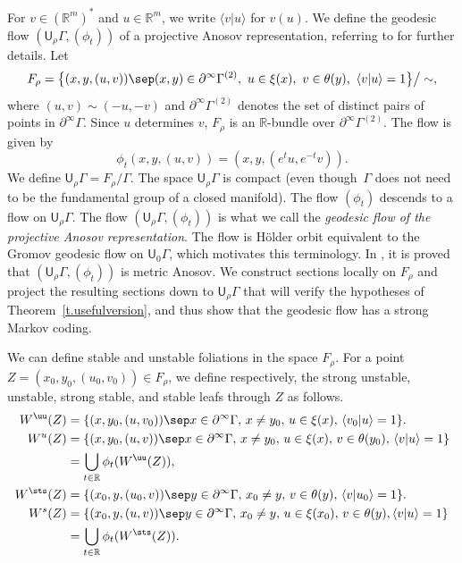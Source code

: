 For $v\in (\mathbb{R}^m)^*$ and $u\in\mathbb{R}^m$, we write $\langle v | u \rangle$ for $v(u)$. We define the geodesic flow $(\mathsf{U}_\rho\Gamma,(\phi_t))$ of a projective Anosov representation, referring to \cite[\S4]{bcls} for further details. Let\vspace*{-3pt}
\[ F_\rho = \bigl\{ (x,y,(u,v)) \sep (x,y)\in\partial^\infty\Gamma^{(2)}, \ u\in \xi(x), \ v\in \theta(y), \ \langle v|u\rangle =1\bigr\}\big/\sim,\]
where $(u,v)\sim(-u,-v)$ and $\partial^\infty\Gamma^{(2)}$ denotes the set of distinct pairs of points in $\partial^\infty\Gamma$. Since $u$ determines $v$, $F_\rho$ is an $\mathbb{R}$-bundle over $\partial^\infty\Gamma^{(2)}$. The flow is given by\vspace*{-3pt}
\[ \phi_t(x,y,(u,v)) = (x,y,(e^tu,e^{-t}v)).\]
We define $\mathsf{U}_\rho\Gamma = F_\rho/\Gamma$. The space $\mathsf{U}_\rho\Gamma$ is compact \cite[Prop.\,4.1]{bcls} (even though~$\Gamma$ does not need to be the fundamental group of a closed manifold). The flow $(\phi_t)$ \hbox{descends} to a flow on $\mathsf{U}_\rho\Gamma$. The flow $(\mathsf{U}_\rho\Gamma, (\phi_t))$ is what we call the \emph{geodesic flow of the projective Anosov representation}. The flow is Hölder orbit equivalent to the \hbox{Gromov} geodesic flow on $\mathsf{U}_0\Gamma$, which motivates this terminology. In \cite[Th.\,1.10]{bcls}, it is proved that $(\mathsf{U}_\rho\Gamma, (\phi_t))$ is metric Anosov. We construct sections locally on $F_\rho$ and project the resulting sections down to $\mathsf{U}_\rho\Gamma$ that will verify the hypotheses of Theorem~\ref{t.usefulversion}, and thus show that the geodesic flow has a strong Markov coding.

We can define stable and unstable foliations in the space $F_\rho$. For a point $Z=(x_0,y_0,(u_0,v_0))\in F_\rho$, we define respectively, the strong unstable, unstable, strong stable, and stable leafs through $Z$ as follows.\vspace*{-3pt}
\begin{align*}
W^{\uu}(Z) &=\{ (x,y_0,(u,v_0)) \sep x\in\partial^\infty\Gamma,\, x\neq y_0,\, u\in\xi(x),\, \langle v_0|u \rangle =1\}. \\
W^u(Z) &=\{ (x,y_0,(u,v)) \sep x\in\partial^\infty\Gamma,\, x\neq y_0,\, u\in\xi(x),\, v\in\theta(y_0),\, \langle v|u \rangle =1\} \\
& = \bigcup_{t\in\mathbb{R}} \phi_t(W^{\uu}(Z)), \\
W^{\sts}(Z) &=\{ (x_0,y,(u_0,v)) \sep y\in\partial^\infty\Gamma,\, x_0\neq y,\, v\in\theta(y),\, \langle v|u_0 \rangle =1\}. \\
W^s (Z) &=\{ (x_0,y,(u,v)) \sep y\in\partial^\infty\Gamma,\, x_0\neq y,\, u\in\xi(x_0),\, v\in\theta(y), \langle v|u \rangle =1\} \\
& = \bigcup_{t\in\mathbb{R}} \phi_t(W^{\sts}(Z)).
\end{align*}

